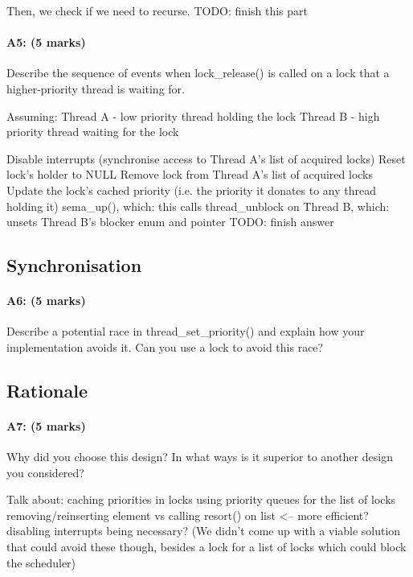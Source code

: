     Then, we check if we need to recurse. TODO: finish this part

\paragraph{A5: (5 marks)}
Describe the sequence of events when lock\_release() is called on a lock that a higher-priority thread is waiting for.
  
Assuming:
  Thread A - low priority thread holding the lock
  Thread B - high priority thread waiting for the lock

  Disable interrupts (synchronise access to Thread A's list of acquired locks)
  Reset lock's holder to NULL
  Remove lock from Thread A's list of acquired locks
  Update the lock's cached priority (i.e. the priority it donates to any thread holding it)
  sema_up(), which:
    this calls thread_unblock on Thread B, which:
      unsets Thread B's blocker enum and pointer
      TODO: finish answer

\subsection{Synchronisation}
\paragraph{A6: (5 marks)}
Describe a potential race in thread\_set\_priority() and explain how your implementation avoids it.  Can you use a lock to avoid this race?

\subsection{Rationale}
\paragraph{A7: (5 marks)}
Why did you choose this design?  In what ways is it superior to another design you considered?

Talk about:
	caching priorities in locks
	using priority queues for the list of locks
  removing/reinserting element vs calling resort() on list <-- more efficient?
	disabling interrupts being necessary? (We didn't come up with a viable solution that could avoid these though, besides a lock for a list of locks which could block the scheduler)
